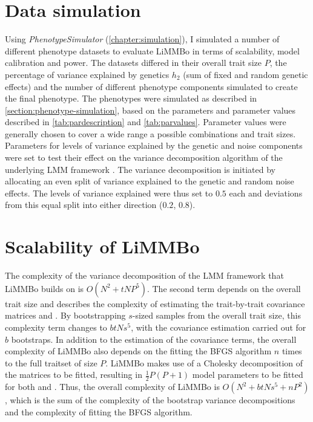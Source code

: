 \section{Data simulation}
\label{section:data-limmbo}
Using \textit{PhenotypeSimulator} (\cref{chapter:simulation}), I simulated a number of different phenotype datasets to evaluate LiMMBo in terms of scalability, model calibration and power. The datasets differed in their overall trait size \(P\), the percentage of variance explained by genetics \(h_2\) (sum of fixed and random genetic effects) and the number of different phenotype components simulated to create the final phenotype. The phenotypes were simulated as described in \cref{section:phenotype-simulation}, based on the parameters and parameter values described in \cref{tab:pardescription} and \cref{tab:parvalues}. Parameter values were generally chosen to cover a wide range a possible combinations and trait sizes. Parameters for levels of variance explained by the genetic and noise components were set to test their effect on the variance decomposition algorithm of the underlying LMM framework \citep{Casale2015}. The variance decomposition is initiated by allocating an even split of variance explained to the genetic and random noise effects. The levels of variance explained were thus set to \(0.5\) each and deviations from this equal split into either direction (\(0.2\), \(0.8\)). 
%

\section{Scalability of LiMMBo}
\label{section:scalability-limmbo}
The complexity of the variance decomposition of the LMM framework that LiMMBo builds on is \(O(N^2 + tNP^5)\). The second term depends on the overall trait size and describes the complexity of estimating the trait-by-trait covariance matrices   and  . By bootstrapping \(s\)-sized samples from the overall trait size, this complexity term changes to \(btNs^5\), with the covariance estimation carried out for \(b\) bootstraps. In addition to the estimation of the covariance terms, the overall complexity of LiMMBo also depends on the fitting the BFGS algorithm \(n\) times to the full traitset of size \(P\). LiMMBo makes use of a Cholesky decomposition of the matrices to be fitted, resulting in $\frac{1}{2}P(P+1)$ model parameters to be fitted for both   and  . Thus, the overall complexity of LiMMBo is \(O(N^2 + btNs^5 + nP^2)\), which is the sum of the complexity of the bootstrap variance decompositions and the complexity of fitting the BFGS algorithm.  

